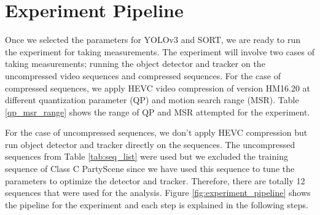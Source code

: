\section{Experiment Pipeline}
\label{sec:methods/section_c}

Once we selected the parameters for YOLOv3 and SORT, we are ready to run the experiment for taking measurements. The experiment will involve two cases of taking measurements; running the object detector and tracker on the uncompressed video sequences and compressed sequences. For the case of compressed sequences, we apply HEVC video compression of version HM16.20 at different quantization parameter (QP) and motion search range (MSR). Table \ref{qp_msr_range} shows the range of QP and MSR attempted for the experiment.

For the case of uncompressed sequences, we don't apply HEVC compression but run object detector and tracker directly on the sequences. The uncompressed sequences from Table \ref{tab:seq_list} were used but we excluded the training sequence of Class C PartyScene since we have used this sequence to tune the parameters to optimize the detector and tracker. Therefore, there are totally 12 sequences that were used for the analysis. Figure \ref{fig:experiment_pipeline} shows the pipeline for the experiment and each step is explained in the following steps.



